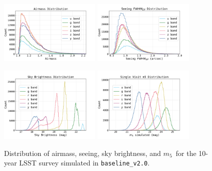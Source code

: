 \documentclass[PST,authoryear,toc]{lsstdoc}
\newcommand{\mf}{\ensuremath{m_5}}
\newcommand{\baseline}{\texttt{baseline\_v2.0}}
\begin{document}
\begin{figure}
\centering
\includegraphics[width=0.43\textwidth]{figures/baseline_v2_0_10yrs_Count_airmass_u_g_r_i_z_y_ONED_ComboBinnedData.pdf}
\includegraphics[width=0.43\textwidth]{figures/baseline_v2_0_10yrs_Count_seeingFwhmEff_u_g_r_i_z_y_ONED_ComboBinnedData.pdf}

\includegraphics[width=0.43\textwidth]{figures/baseline_v2_0_10yrs_Count_skyBrightness_u_g_r_i_z_y_ONED_ComboBinnedData.pdf}
\includegraphics[width=0.43\textwidth]{figures/baseline_v2_0_10yrs_Count_fiveSigmaDepth_u_g_r_i_z_y_ONED_ComboBinnedData.pdf}
\caption{Distribution of airmass, seeing, sky brightness, and \mf\ for the 10-year LSST survey simulated in \baseline.}\label{fig:bv2distributions}
\end{figure}
\FloatBarrier
\end{document}
